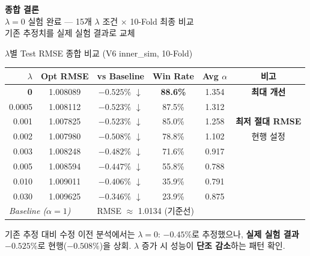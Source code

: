 \documentclass[aspectratio=169,10pt]{beamer}
\begin{document}
\begin{frame}[plain]
	\begin{center}
		{\Large\bfseries 종합 결론}\\[0.5em]
		{\large $\lambda=0$ 실험 완료 --- 15개 $\lambda$ 조건 $\times$ 10-Fold 최종 비교}\\[0.3em]
		{\normalsize 기존 추정치를 실제 실험 결과로 교체}
	\end{center}
\end{frame}

\begin{frame}[shrink=8]{$\lambda$별 Test RMSE 종합 비교 \textnormal{\small(V6 inner\_sim, 10-Fold)}}
	\begin{center}
	\renewcommand{\arraystretch}{1.25}
	\begin{tabular}{r|c|c|c|c|c}
		\toprule
		$\lambda$ & Opt RMSE & vs Baseline & Win Rate & Avg $\alpha$ & 비고 \\
		\midrule
		\rowcolor{testgreen!20}
		\textbf{0}       & 1.008089 & $\mathbf{-0.525\%}$ \textcolor{testgreen}{$\downarrow$} & \textbf{88.6\%} & 1.354 & \textbf{최대 개선} \\
		0.0005   & 1.008112 & $-0.523\%$ \textcolor{testgreen}{$\downarrow$} & 87.5\% & 1.312 & \\
		\rowcolor{testgreen!10}
		0.001    & 1.007825 & $-0.523\%$ \textcolor{testgreen}{$\downarrow$} & 85.0\% & 1.258 & \textbf{최저 절대 RMSE} \\
		0.002    & 1.007980 & $-0.508\%$ \textcolor{testgreen}{$\downarrow$} & 78.8\% & 1.102 & 현행 설정 \\
		0.003    & 1.008248 & $-0.482\%$ \textcolor{testgreen}{$\downarrow$} & 71.6\% & 0.917 & \\
		0.005    & 1.008594 & $-0.447\%$ \textcolor{testgreen}{$\downarrow$} & 55.8\% & 0.788 & \\
		0.010    & 1.009011 & $-0.406\%$ \textcolor{testgreen}{$\downarrow$} & 35.9\% & 0.791 & \\
		0.030    & 1.009625 & $-0.346\%$ \textcolor{testgreen}{$\downarrow$} & 23.9\% & 0.875 & \\
		\midrule
		\multicolumn{2}{l|}{\textit{Baseline ($\alpha=1$)}} & \multicolumn{4}{l}{RMSE $\approx$ 1.0134  (기준선)} \\
		\bottomrule
	\end{tabular}
	\end{center}

	\vspace{0.3em}
	\begin{alertblock}{기존 추정 대비 수정}
		이전 분석에서는 $\lambda=0$: $-0.45\%$로 추정했으나,
		\textbf{실제 실험 결과 $-0.525\%$}로 현행($-0.508\%$)을 상회.
		$\lambda$ 증가 시 성능이 \textbf{단조 감소}하는 패턴 확인.
	\end{alertblock}
\end{frame}
\end{document}
